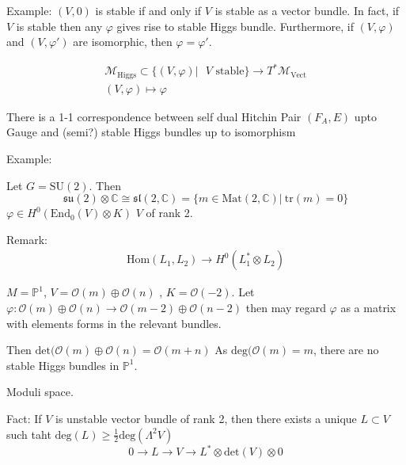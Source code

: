 Example: $(V,0)$ is stable if and only if $ V$ is stable as a vector bundle. 
In fact, if $ V$ is stable then any $\varphi$ gives rise to stable Higgs bundle. 
Furthermore, if $(V, \varphi)$ and $(V, \varphi') $ are isomorphic, then $ \varphi = \varphi'$.

\begin{align}
    \mathcal{M}_{\mathrm{Higgs}} \subset \{ ( V,\varphi) | \mbox{ $V$ stable} \} \rightarrow T^* \mathcal{M}_{\mathrm{Vect}} \\
    ( V, \varphi) \mapsto \varphi 
\end{align}

There is a 1-1 correspondence between self dual  Hitchin Pair $(F_A , E) $ upto Gauge 
and (semi?) stable Higgs bundles up to isomorphism 

Example: 

Let $ G = \mathrm{SU}(2) $. 
Then 
\begin{equation}
    \mathfrak{su}(2) \otimes \mathbb{C}  \cong \mathfrak{sl}(2, \mathbb{C} ) = \{ m \in \mathrm{Mat}(2, \mathbb{C} )| ~ \mathrm{tr}(m) = 0 \}
\end{equation}
$ \varphi \in H^0 ( \mathrm{End} _0 ( V) \otimes K) $ 
$V$ of rank 2. 

Remark: 
\begin{align}
    \mathrm{Hom} ( L_1 , L_2 ) \rightarrow  H^0 ( L_1 ^* \otimes L_2 ) 
\end{align}

$M = \mathbb{P} ^1 $, $V = \mathcal{O} (m) \oplus \mathcal{O} (n) $ , $K = \mathcal{O}(-2) $. 
Let $ \varphi: \mathcal{O} ( m) \oplus \mathcal{O} ( n) \rightarrow  \mathcal{O} (m -2) \oplus \mathcal{O} (n-2) $ 
then may regard $\varphi $ as a matrix with elements forms in the relevant bundles. 

Then $ \mathrm{det}(\mathcal{O} ( m) \oplus \mathcal{O} (n) = \mathcal{O} (m+n) $
As $ \mathrm{deg}( \mathcal{O} (m) = m $, there are no stable Higgs bundles in $\mathbb{P} ^1$. 

Moduli space. 

Fact: If $V$ is unstable vector bundle of rank 2, 
then there exists a unique $L \subset V$ such taht 
$ \mathrm{deg}(L) \geq \frac{1}{2} \mathrm{deg} (\Lambda^2 V ) $ 
\begin{equation}
    0 \rightarrow  L \rightarrow V \rightarrow  L^* \otimes \mathrm{det} (V) \otimes 0 
\end{equation}

